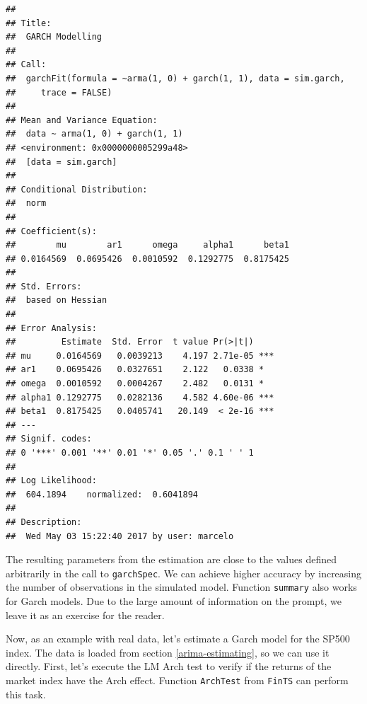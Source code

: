\documentclass[11pt,]{book}
\newenvironment{Shaded}{\begin{snugshade}}{\end{snugshade}}
\newcommand{\KeywordTok}[1]{\textcolor[rgb]{0.27,0.27,0.27}{\textbf{#1}}}
\newcommand{\DataTypeTok}[1]{\textcolor[rgb]{0.27,0.27,0.27}{#1}}
\newcommand{\DecValTok}[1]{\textcolor[rgb]{0.06,0.06,0.06}{#1}}
\newcommand{\StringTok}[1]{\textcolor[rgb]{0.5,0.5,0.5}{#1}}
\newcommand{\CommentTok}[1]{\textcolor[rgb]{0.56,0.35,0.01}{\textit{#1}}}
\newcommand{\OperatorTok}[1]{\textcolor[rgb]{0.81,0.36,0.00}{\textbf{#1}}}
\newcommand{\NormalTok}[1]{#1}
\begin{document}
\begin{verbatim}
## 
## Title:
##  GARCH Modelling 
## 
## Call:
##  garchFit(formula = ~arma(1, 0) + garch(1, 1), data = sim.garch, 
##     trace = FALSE) 
## 
## Mean and Variance Equation:
##  data ~ arma(1, 0) + garch(1, 1)
## <environment: 0x0000000005299a48>
##  [data = sim.garch]
## 
## Conditional Distribution:
##  norm 
## 
## Coefficient(s):
##        mu        ar1      omega     alpha1      beta1  
## 0.0164569  0.0695426  0.0010592  0.1292775  0.8175425  
## 
## Std. Errors:
##  based on Hessian 
## 
## Error Analysis:
##         Estimate  Std. Error  t value Pr(>|t|)    
## mu     0.0164569   0.0039213    4.197 2.71e-05 ***
## ar1    0.0695426   0.0327651    2.122   0.0338 *  
## omega  0.0010592   0.0004267    2.482   0.0131 *  
## alpha1 0.1292775   0.0282136    4.582 4.60e-06 ***
## beta1  0.8175425   0.0405741   20.149  < 2e-16 ***
## ---
## Signif. codes:  
## 0 '***' 0.001 '**' 0.01 '*' 0.05 '.' 0.1 ' ' 1
## 
## Log Likelihood:
##  604.1894    normalized:  0.6041894 
## 
## Description:
##  Wed May 03 15:22:40 2017 by user: marcelo
\end{verbatim}

The resulting parameters from the estimation are close to the values
defined arbitrarily in the call to \texttt{garchSpec}. We can achieve
higher accuracy by increasing the number of observations in the
simulated model. Function \texttt{summary} also works for Garch models.
Due to the large amount of information on the prompt, we leave it as an
exercise for the reader.

Now, as an example with real data, let's estimate a Garch model for the
SP500 index. The data is loaded from section \ref{arima-estimating}, so
we can use it directly. First, let's execute the LM Arch test
\citep{engle1982autoregressive, tsay2005analysis} to verify if the
returns of the market index have the Arch effect. Function
\texttt{ArchTest} from \texttt{FinTS} \citep{fints} can perform this
task.  

\begin{Shaded}
\end{Shaded}
\end{document}
